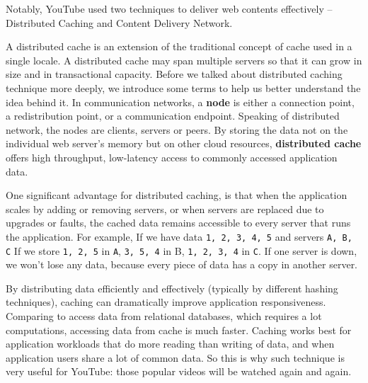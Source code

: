 Notably, YouTube used two techniques to deliver web contents effectively -- Distributed Caching and Content Delivery Network.

A distributed cache is an extension of the traditional concept of cache used in a single locale. A distributed cache may span multiple servers so that it can grow in size and in transactional capacity\cite{wiki:dcache}. Before we talked about distributed caching technique more deeply, we introduce some terms to help us better understand the idea behind it. In communication networks, a \textbf{node} is either a connection point, a redistribution point, or a communication endpoint. Speaking of distributed network, the nodes are clients, servers or peers. By storing the data not on the individual web server's memory but on other cloud resources, \textbf{distributed cache} offers high throughput, low-latency access to commonly accessed application data.

One significant advantage for distributed caching, is that when the application scales by adding or removing servers, or when servers are replaced due to upgrades or faults, the cached data remains accessible to every server that runs the application. For example, If we have data \texttt{1, 2, 3, 4, 5} and servers \texttt{A, B, C} If we store \texttt{1, 2, 5} in \texttt{A}, \texttt{3, 5, 4} in B, \texttt{1, 2, 3, 4} in \texttt{C}. If one server is down, we won't lose any data, because every piece of data has a copy in another server.


By distributing data efficiently and effectively (typically by different hashing techniques), caching can dramatically improve application responsiveness. Comparing to access data from relational databases, which requires a lot computations, accessing data from cache is much faster. Caching works best for application workloads that do more reading than writing of data, and when application users share a lot of common data. So this is why such technique is very useful for YouTube: those popular videos will be watched again and again.

